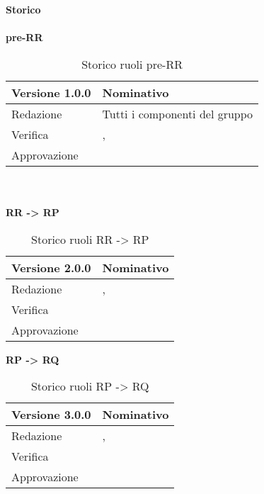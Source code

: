\newpage
\Large{\textbf{Storico }}\\
\normalsize \\

\noindent \textbf{pre-RR}
\label{tabVers1}
\begin{table}[h]
	\begin{tabular}{p{} p{}}
		\toprule \textbf{Versione 1.0.0}	&	\textbf{Nominativo}\\
		\midrule Redazione	& Tutti i componenti del gruppo\\
		\midrule Verifica & \PM, \BM\\
		\midrule Approvazione	& \TP\\
		\bottomrule
	\end{tabular}
	\caption{Storico ruoli pre-RR}
\end{table}
\\
\normalsize \\
\noindent \textbf{RR -> RP}
\label{tabVers2}
\begin{table}[h]
	\begin{tabular}{p{} p{}}
		\toprule \textbf{Versione 2.0.0}	&	\textbf{Nominativo}\\
		\midrule Redazione	& \FM, \BM\\
		\midrule Verifica & \GP\\
		\midrule Approvazione	& \VG\\
		\bottomrule
	\end{tabular}
	\caption{Storico ruoli RR -> RP}
\end{table}

\noindent \textbf{RP -> RQ}
\label{tabVers3}
\begin{table}[h]
	\begin{tabular}{p{} p{}}
		\toprule \textbf{Versione 3.0.0}	&	\textbf{Nominativo}\\
		\midrule Redazione	& \PM, \GP\\
		\midrule Verifica & \TP\\
		\midrule Approvazione	& \FM\\
		\bottomrule
	\end{tabular}
	\caption{Storico ruoli RP -> RQ}
\end{table}